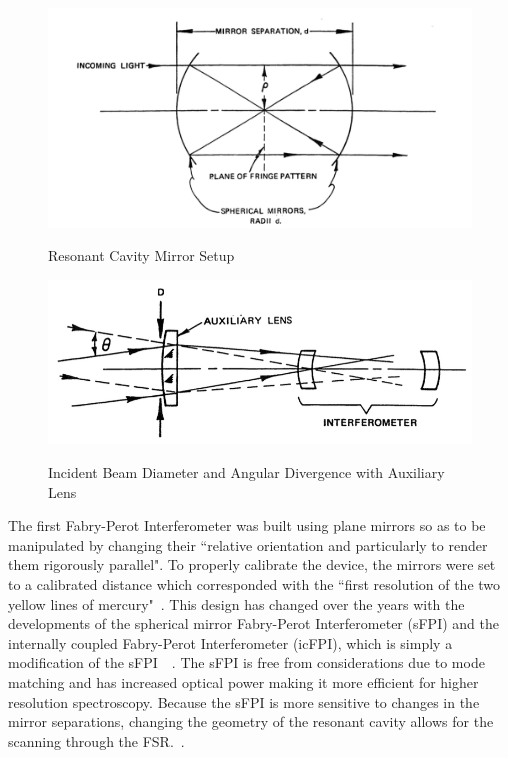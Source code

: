 \documentclass[12pt]{report}
\begin{document}
\begin{figure}[h!]
  \centering
	\includegraphics[width=6in]{Fig1A.png}\\
	\caption[Resonant Cavity Setup]{Resonant Cavity Mirror Setup~\cite{spectraphysics470}}
	\label{fig:mirrorsetup}
\end{figure}

\begin{figure}[h!]
  \centering
	\includegraphics[width=6in]{Fig2A.png}\\
	\caption[Auxiliary Lens Setup]{Incident Beam Diameter and Angular Divergence with Auxiliary Lens~\cite{spectraphysics470}}
	\label{fig:beamdia}
\end{figure}


The first Fabry-Perot Interferometer was built using plane mirrors so as to be manipulated by changing their ``relative orientation and particularly to render them rigorously parallel". To properly calibrate the device, the mirrors were set to a calibrated distance which corresponded with the ``first resolution of the two yellow lines of mercury"~\cite{fabry-perot}. This design has changed over the years with the developments of the spherical mirror Fabry-Perot Interferometer (sFPI) and the internally coupled Fabry-Perot Interferometer (icFPI), which is simply a modification of the sFPI~\cite{hercher}~\cite{reich}. The sFPI is free from considerations due to mode matching and has increased optical power making it more efficient for higher resolution spectroscopy. Because the sFPI is more sensitive to changes in the mirror separations, changing the geometry of the resonant cavity allows for the scanning through the FSR.~\cite{hercher}. \newline
\end{document}
